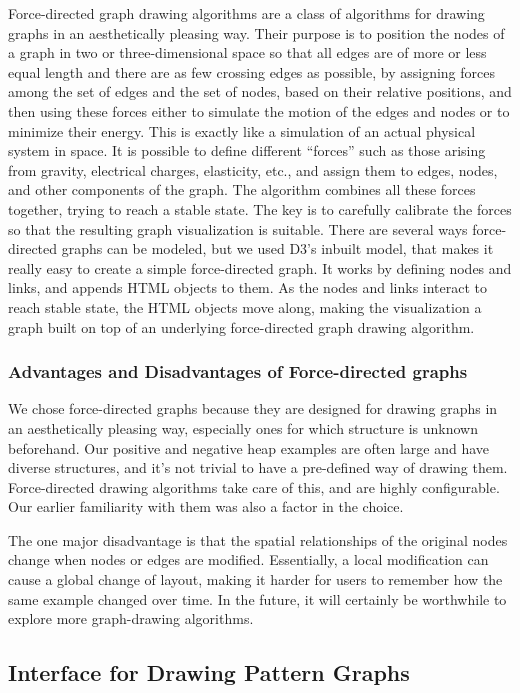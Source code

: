 Force-directed graph drawing algorithms \cite{eades84, fruchterman91} are a class of
algorithms for drawing graphs in an aesthetically pleasing way. Their purpose is to
position the nodes of a graph in two or three-dimensional space so that all edges are of
more or less equal length and there are as few crossing edges as possible, by assigning
forces among the set of edges and the set of nodes, based on their relative positions,
and then using these forces either to simulate the motion of the edges and nodes or to
minimize their energy. This is exactly like a simulation of an actual physical system in
space. It is possible to define different ``forces'' such as those arising from gravity,
electrical charges, elasticity, etc., and assign them to edges, nodes, and other
components of the graph. The algorithm combines all these forces together, trying to
reach a stable state. The key is to carefully calibrate the forces so that the resulting
graph visualization is suitable. There are several ways force-directed graphs can be
modeled, but we used D3's inbuilt model, that makes it really easy to create a simple
force-directed graph. It works by defining nodes and links, and appends HTML objects to
them. As the nodes and links interact to reach stable state, the HTML objects move
along, making the visualization a graph built on top of an underlying force-directed
graph drawing algorithm.

\subsubsection{Advantages and Disadvantages of Force-directed graphs}
We chose force-directed graphs because they are designed for drawing graphs in an
aesthetically pleasing way, especially ones for which structure is unknown beforehand.
Our positive and negative heap examples are often large and have diverse structures, and
it's not trivial to have a pre-defined way of drawing them. Force-directed drawing
algorithms take care of this, and are highly configurable. Our earlier familiarity with
them was also a factor in the choice.

The one major disadvantage is that the spatial relationships of the original nodes
change when nodes or edges are modified. Essentially, a local modification can cause a
global change of layout, making it harder for users to remember how the same example
changed over time. In the future, it will certainly be worthwhile to explore more
graph-drawing algorithms.

\subsection{Interface for Drawing Pattern Graphs}

